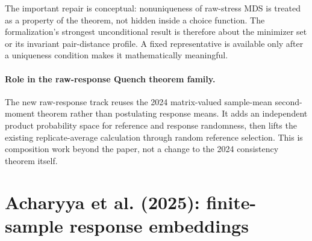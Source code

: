 \documentclass[11pt]{article}
\begin{document}
The important repair is conceptual: nonuniqueness of raw-stress MDS is treated
as a property of the theorem, not hidden inside a choice function.  The
formalization's strongest unconditional result is therefore about the minimizer
set or its invariant pair-distance profile.  A fixed representative is available
only after a uniqueness condition makes it mathematically meaningful.


\paragraph{Role in the raw-response Quench theorem family.}
The new raw-response track reuses the 2024 matrix-valued sample-mean
second-moment theorem rather than postulating response means.  It adds an
independent product probability space for reference and response randomness,
then lifts the existing replicate-average calculation through random reference
selection.  This is composition work beyond the paper, not a change to the
2024 consistency theorem itself.

\section{Acharyya et al. (2025): finite-sample response embeddings}
\end{document}
